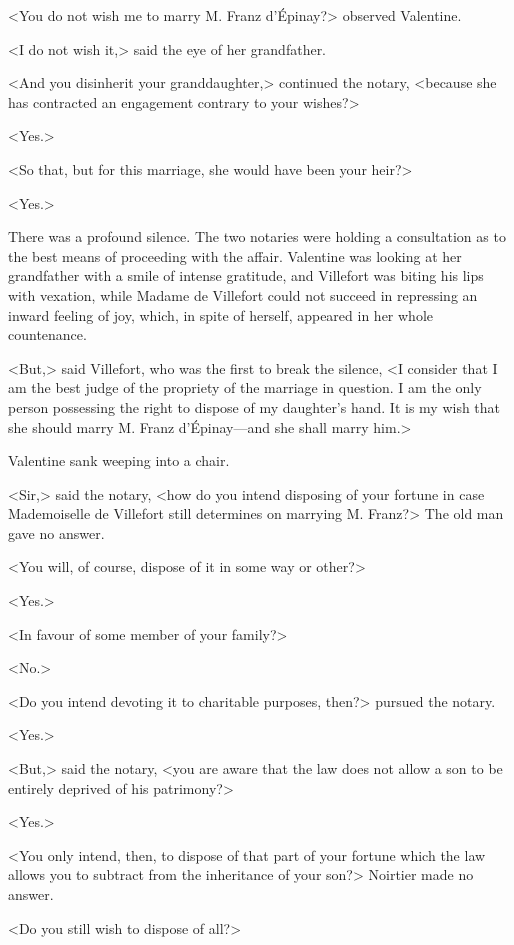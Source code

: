  <You do not wish me to marry M. Franz d'Épinay?> observed Valentine. 

 <I do not wish it,> said the eye of her grandfather. 

 <And you disinherit your granddaughter,> continued the notary, <because she has contracted an engagement contrary to your wishes?> 

 <Yes.> 

 <So that, but for this marriage, she would have been your heir?> 

 <Yes.> 

 There was a profound silence. The two notaries were holding a consultation as to the best means of proceeding with the affair. Valentine was looking at her grandfather with a smile of intense gratitude, and Villefort was biting his lips with vexation, while Madame de Villefort could not succeed in repressing an inward feeling of joy, which, in spite of herself, appeared in her whole countenance. 

 <But,> said Villefort, who was the first to break the silence, <I consider that I am the best judge of the propriety of the marriage in question. I am the only person possessing the right to dispose of my daughter's hand. It is my wish that she should marry M. Franz d'Épinay—and she shall marry him.> 

 Valentine sank weeping into a chair. 

 <Sir,> said the notary, <how do you intend disposing of your fortune in case Mademoiselle de Villefort still determines on marrying M. Franz?> The old man gave no answer. 

 <You will, of course, dispose of it in some way or other?> 

 <Yes.> 

 <In favour of some member of your family?> 

 <No.> 

 <Do you intend devoting it to charitable purposes, then?> pursued the notary. 

 <Yes.> 

 <But,> said the notary, <you are aware that the law does not allow a son to be entirely deprived of his patrimony?> 

 <Yes.> 

 <You only intend, then, to dispose of that part of your fortune which the law allows you to subtract from the inheritance of your son?> Noirtier made no answer. 

 <Do you still wish to dispose of all?> 

